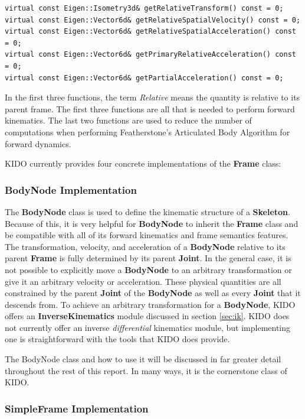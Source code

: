 \begin{lstlisting}
virtual const Eigen::Isometry3d& getRelativeTransform() const = 0;
virtual const Eigen::Vector6d& getRelativeSpatialVelocity() const = 0;
virtual const Eigen::Vector6d& getRelativeSpatialAcceleration() const = 0;
virtual const Eigen::Vector6d& getPrimaryRelativeAcceleration() const = 0;
virtual const Eigen::Vector6d& getPartialAcceleration() const = 0;
\end{lstlisting}

In the first three functions, the term \textit{Relative} means the quantity is relative to its parent frame. The first three functions are all that is needed to perform forward kinematics. The last two functions are used to reduce the number of computations when performing Featherstone's Articulated Body Algorithm for forward dynamics.

KIDO currently provides four concrete implementations of the \textbf{Frame} class:

\subsubsection{BodyNode Implementation}

The \textbf{BodyNode} class is used to define the kinematic structure of a \textbf{Skeleton}. Because of this, it is very helpful for \textbf{BodyNode} to inherit the \textbf{Frame} class and be compatible with all of its forward kinematics and frame semantics features. The transformation, velocity, and acceleration of a \textbf{BodyNode} relative to its parent \textbf{Frame} is fully determined by its parent \textbf{Joint}. In the general case, it is not possible to explicitly move a \textbf{BodyNode} to an arbitrary transformation or give it an arbitrary velocity or acceleration. These physical quantities are all constrained by the parent \textbf{Joint} of the \textbf{BodyNode} as well as every \textbf{Joint} that it descends from. To achieve an arbitrary transformation for a \textbf{BodyNode}, KIDO offers an \textbf{InverseKinematics} module discussed in section \ref{sec:ik}. KIDO does not currently offer an inverse \textit{differential} kinematics module, but implementing one is straightforward with the tools that KIDO does provide.

The BodyNode class and how to use it will be discussed in far greater detail throughout the rest of this report. In many ways, it is the cornerstone class of KIDO.

\subsubsection{SimpleFrame Implementation}

